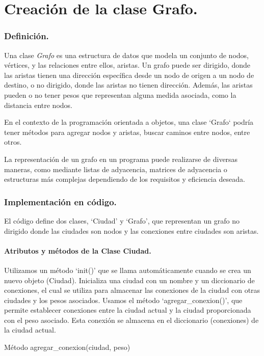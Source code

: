 \documentclass[12pt,oneside]{book}
\begin{document}
\newpage
\chapter*{Creación de la clase Grafo.}
    \subsection{Definición.}
 Una clase \textit{Grafo} es una estructura de datos que modela un conjunto de nodos, vértices, y las relaciones entre ellos, aristas. Un grafo puede ser dirigido, donde las aristas tienen una dirección específica desde un nodo de origen a un nodo de destino, o no dirigido, donde las aristas no tienen dirección. Además, las aristas pueden o no tener pesos que representan alguna medida asociada, como la distancia entre nodos.
 
En el contexto de la programación orientada a objetos, una clase `Grafo` podría tener métodos para agregar nodos y aristas, buscar caminos entre nodos, entre otros.

La representación de un grafo en un programa puede realizarse de diversas maneras, como mediante listas de adyacencia, matrices de adyacencia o estructuras más complejas dependiendo de los requisitos y eficiencia deseada.
    \subsection{Implementación en código.}
El código define dos clases, ‘Ciudad’ y ‘Grafo’, que representan un grafo no dirigido donde las ciudades son nodos y las conexiones entre ciudades son aristas.
    \subsubsection{Atributos y métodos de la Clase Ciudad.}
Utilizamos un método ‘init()’ que se llama automáticamente cuando se crea un nuevo objeto (Ciudad). Inicializa una ciudad con un nombre y un diccionario de conexiones, el cual se utiliza para almacenar las conexiones de la ciudad con otras ciudades y los pesos asociados.
Usamos el método ‘agregar\_conexion()’, que permite establecer conexiones entre la ciudad actual y la ciudad proporcionada con el peso asociado. Esta conexión se almacena en el diccionario (conexiones) de la ciudad actual.



\begin{algorithm}[H]
    \SetAlgoLined
    \caption{Método agregar\_conexion(ciudad, peso)}
\end{algorithm}
\end{document}
